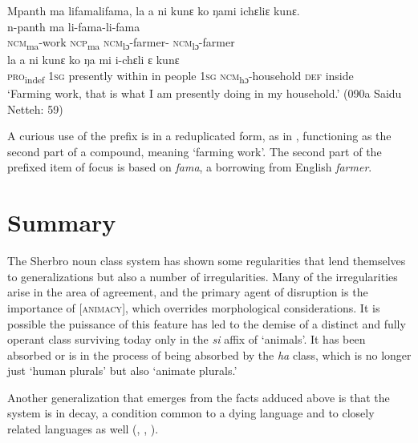 \newpage
\ea%
    \label{ex:157}
    Mpanth ma lifamalifama, la a  ni kunɛ ko ŋami ichɛliɛ   kunɛ.\\
    \gll n-panth      ma    li-fama-li-fama\\
    \textsc{ncm}\textsubscript{ma}{}-work  \textsc{ncp}\textsubscript{ma}    \textsc{ncm}\textsubscript{lɔ}{}-farmer- \textsc{ncm}\textsubscript{lɔ}{}-farmer\\
    \gll la      a    ni        kunɛ    ko    ŋa      mi    i-chɛli        ɛ    kunɛ\\
    \textsc{pro}\textsubscript{indef}  \textsc{1sg}  presently  within  in    people  \textsc{1sg}  \textsc{ncm}\textsubscript{hɔ}{}-household  \textsc{def}  inside\\
    \glt ‘Farming work, that is what I am presently doing in my household.' (090a Saidu Netteh: 59)
\z

A curious use of the prefix is in a reduplicated form, as in , functioning as the second part of a compound, meaning ‘farming work'. The second part of the prefixed item of focus is based on \textit{fama}, a borrowing from English \textit{farmer}.

\section{Summary}
\label{sec:5.11}\hypertarget{Toc115517798}{}
The Sherbro noun class system has shown some regularities that lend themselves to generalizations but also a number of irregularities. Many of the irregularities arise in the area of agreement, and the primary agent of disruption is the importance of [\textsc{animacy}], which overrides morphological considerations. It is possible the puissance of this feature has led to the demise of a distinct and fully operant class surviving today only in the \textit{si} affix of ‘animals'. It has been absorbed or is in the process of being absorbed by the \textit{ha} class, which is no longer just ‘human plurals' but also ‘animate plurals.'

Another generalization that emerges from the facts adduced above is that the system is in decay, a condition common to a dying language and to closely related languages as well (\citealt{CampbellMuntzel1989}, \citealt{Childs2009}, \citealt{Sasse1992}).

